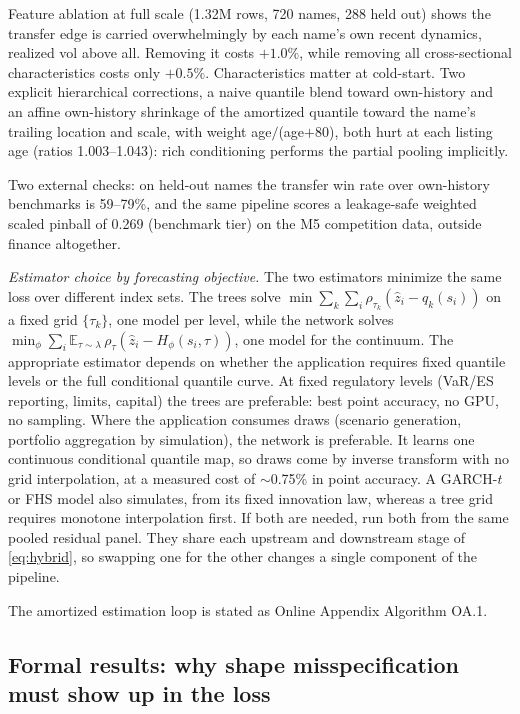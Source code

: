 \documentclass[11pt]{article}
\theoremstyle{remark}
\begin{document}
Feature ablation at full scale (1.32M rows, 720 names, 288 held out) shows the transfer edge is carried overwhelmingly by each name's own recent dynamics, realized vol above all. Removing it costs $+1.0\%$, while removing all cross-sectional characteristics costs only $+0.5\%$. Characteristics matter at cold-start. Two explicit hierarchical corrections, a naive quantile blend toward
own-history and an affine own-history shrinkage of the amortized quantile toward the name's trailing location and scale, with weight age$/$(age$+80$), both
hurt at each listing age (ratios 1.003--1.043): rich
conditioning performs the partial pooling implicitly.

Two external checks: on held-out names the
transfer win rate over own-history benchmarks is 59--79\%, and the same
pipeline scores a leakage-safe weighted scaled pinball of 0.269
(benchmark tier) on the M5 competition data, outside finance
altogether.

\noindent\emph{Estimator choice by forecasting objective.} The two estimators minimize the same loss over different index sets. The trees solve $\min \sum_{k}\sum_{i}\rho_{\tau_k}(\widehat{z}_i - q_k(s_i))$ on a fixed grid $\{\tau_k\}$, one model per level, while the network solves $\min_\phi \sum_i \mathbb{E}_{\tau\sim\lambda}\, \rho_\tau(\widehat{z}_i - H_\phi(s_i,\tau))$, one model for the continuum. The appropriate estimator depends on whether the application requires fixed quantile levels or the full conditional quantile curve.
At fixed regulatory levels (VaR/ES
reporting, limits, capital) the trees are preferable: best point accuracy, no
GPU, no sampling. Where the application consumes draws (scenario generation, portfolio aggregation by simulation), the network is preferable. It learns one continuous conditional quantile map, so draws come by inverse transform with no grid interpolation, at a measured cost of $\sim$0.75\% in point accuracy. A GARCH-$t$ or FHS model also simulates, from its fixed innovation law, whereas a tree grid requires monotone interpolation first. If both are needed,
run both from the same pooled residual panel. They share each upstream
and downstream stage of \eqref{eq:hybrid}, so swapping one for the
other changes a single component of the pipeline.

\noindent The amortized estimation loop is stated as Online Appendix Algorithm OA.1.

\subsection{Formal results: why shape misspecification must show up in
the loss}\label{sec:theory}
\end{document}

